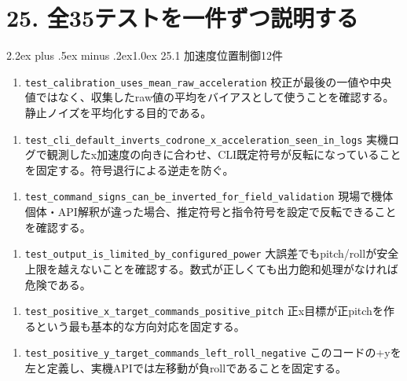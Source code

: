 \documentclass[10pt,a4paper,openany]{ltjsbook}
\makeatletter
\renewcommand\section{\@startsection{section}{1}{0pt}%
  {2.2ex plus .5ex minus .2ex}{1.0ex}%
  {\sffamily\Large\bfseries\color{ReportNavy}}}
\makeatother
\begin{document}
\chapter{25. 全35テストを一件ずつ説明する}
\section{25.1 加速度位置制御12件}
\begin{enumerate}
\item \texttt{test\_calibration\_uses\_mean\_raw\_acceleration}  
校正が最後の一値や中央値ではなく、収集したraw値の平均をバイアスとして使うことを確認する。静止ノイズを平均化する目的である。\par
\end{enumerate}
\begin{enumerate}
\item \texttt{test\_cli\_default\_inverts\_codrone\_x\_acceleration\_seen\_in\_logs}  
実機ログで観測したx加速度の向きに合わせ、CLI既定符号が反転になっていることを固定する。符号退行による逆走を防ぐ。\par
\end{enumerate}
\begin{enumerate}
\item \texttt{test\_command\_signs\_can\_be\_inverted\_for\_field\_validation}  
現場で機体個体・API解釈が違った場合、推定符号と指令符号を設定で反転できることを確認する。\par
\end{enumerate}
\begin{enumerate}
\item \texttt{test\_output\_is\_limited\_by\_configured\_power}  
大誤差でもpitch/rollが安全上限を越えないことを確認する。数式が正しくても出力飽和処理がなければ危険である。\par
\end{enumerate}
\begin{enumerate}
\item \texttt{test\_positive\_x\_target\_commands\_positive\_pitch}  
正x目標が正pitchを作るという最も基本的な方向対応を固定する。\par
\end{enumerate}
\begin{enumerate}
\item \texttt{test\_positive\_y\_target\_commands\_left\_roll\_negative}  
このコードの+yを左と定義し、実機APIでは左移動が負rollであることを固定する。\par
\end{enumerate}
\end{document}
